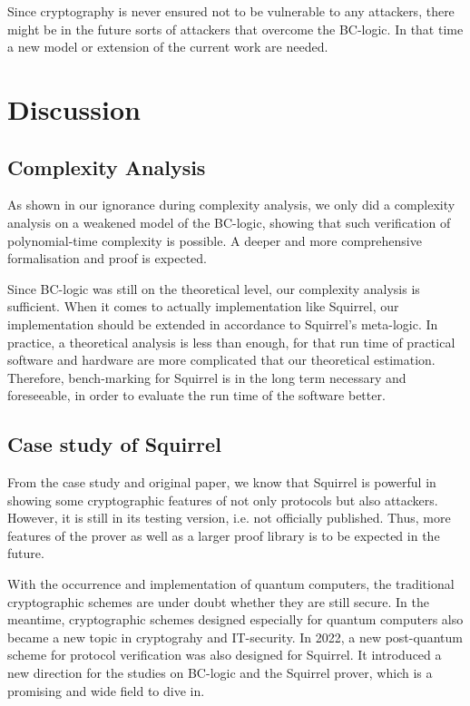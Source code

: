 \documentclass[conference]{IEEEtran}
\begin{document}
Since cryptography is never ensured not to be vulnerable to any attackers, there might be in the future sorts of attackers that overcome the BC-logic. In that time a new model or extension of the current work are needed.
\section{Discussion}
\subsection{Complexity Analysis}
As shown in our ignorance during complexity analysis, we only did a complexity analysis on a weakened model of the BC-logic, showing that such verification of polynomial-time complexity is possible. A deeper and more comprehensive formalisation and proof is expected.

Since BC-logic was still on the theoretical level, our complexity analysis is sufficient. When it comes to actually implementation like Squirrel, our implementation should be extended in accordance to Squirrel's meta-logic. In practice, a theoretical analysis is less than enough, for that run time of practical software and hardware are more complicated that our theoretical estimation. Therefore, bench-marking for Squirrel is in the long term necessary and foreseeable, in order to evaluate the run time of the software better.
\subsection{Case study of Squirrel}
From the case study and original paper, we know that Squirrel is powerful in showing some cryptographic features of not only protocols but also attackers. However, it is still in its testing version, i.e. not officially published. Thus, more features of the prover as well as a larger proof library is to be expected in the future. 

With the occurrence and implementation of quantum computers, the traditional cryptographic schemes are under doubt whether they are still secure. In the meantime, cryptographic schemes designed especially for quantum computers also became a new topic in cryptograhy and IT-security. In 2022, a new post-quantum scheme for protocol verification was also designed for Squirrel.\cite{PostQuantum} It introduced a new direction for the studies on BC-logic and the Squirrel prover, which is a promising and wide field to dive in.
\end{document}
